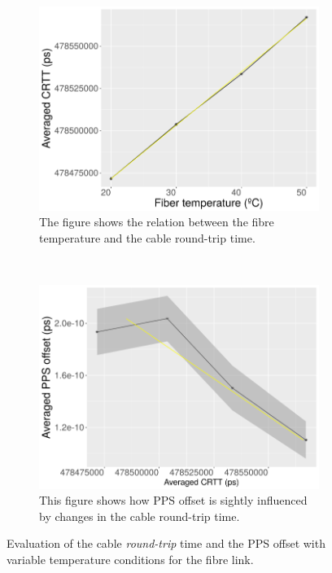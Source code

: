 \begin{figure}
	\centering
	\begin{subfigure}[t]{0.48\textwidth}
		\includegraphics[width=\textwidth]{img/crttvstemp}
		\caption[CRTT vs. Fiber temperature]{The figure shows the relation 
			between the fibre temperature and the cable round-trip time.}
		\label{fig:crttvstemp}
	\end{subfigure}
	~ %
	\begin{subfigure}[t]{0.48\textwidth}
		\includegraphics[width=\textwidth]{img/ppsvscrtt}
		\caption[PPS offset vs. CRTT]{This figure shows how PPS offset is 
			sightly influenced by changes in the cable round-trip time.}
		\label{fig:ppsvscrtt}
	\end{subfigure}
	\caption{Evaluation of the cable \textit{round-trip} time and the PPS 
		offset with variable temperature conditions for the fibre link.}
\end{figure}

